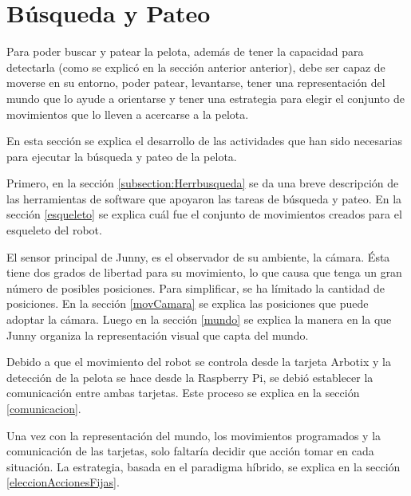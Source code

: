 \section{B\'usqueda y Pateo}\label{chapter:busqueda}

Para poder buscar y patear la pelota, además de tener la capacidad para detectarla (como se explicó en la secci\'on anterior anterior), debe ser capaz de moverse en su entorno, poder patear, levantarse, tener una representación del mundo que lo ayude a orientarse y tener una estrategia para elegir el conjunto de movimientos que lo lleven a acercarse a la pelota. 

En esta sección se explica el desarrollo de las actividades que han sido necesarias para ejecutar la búsqueda y pateo de la pelota.

Primero, en la sección \ref{subsection:Herrbusqueda} se da una breve descripción de las herramientas de software que apoyaron las tareas de búsqueda y pateo. En la sección \ref{esqueleto} se explica cuál fue el conjunto de movimientos creados para el esqueleto del robot.

El sensor principal de Junny, es el observador de su ambiente, la c\'amara. \'Esta tiene dos grados de libertad para su movimiento, lo que causa que tenga un gran número de posibles posiciones. Para simplificar, se ha límitado la cantidad de posiciones. En la secci\'on \ref{movCamara} se explica las posiciones que puede adoptar la cámara. Luego en la secci\'on \ref{mundo} se explica la manera en la que Junny organiza la representaci\'on visual que capta del mundo.

Debido a que el movimiento del robot se controla desde la tarjeta Arbotix y la detecci\'on de la pelota se hace desde la Raspberry Pi, se debi\'o establecer la comunicaci\'on entre ambas tarjetas. Este proceso se explica en la secci\'on \ref{comunicacion}.

Una vez con la representaci\'on del mundo, los movimientos programados y la comunicaci\'on de las tarjetas, solo faltaría decidir que acci\'on tomar en cada situación. La estrategia, basada en el paradigma h\'ibrido, se explica en la secci\'on \ref{eleccionAccionesFijas}.        

 
